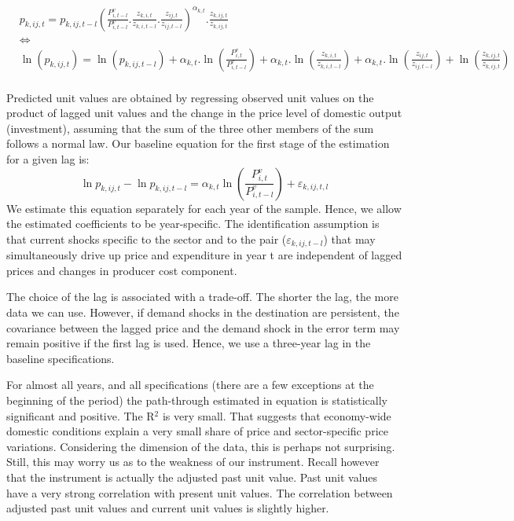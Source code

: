 \documentclass[12pt,twoside,a4paper,notitlepage]{article}
\begin{document}
{\begin{align}
  & {{p}_{k,ij,t}}={{p}_{k,ij,t-l}}{{\left( \frac{P_{i,t-l}^{v}}{P_{i,t-l}^{v}}.\frac{{{z}_{k,i,t}}}{{{z}_{k,i,t-l}}}.\frac{{{z}_{ij,t}}}{{{z}_{ij,t-l}}} \right)}^{{{\alpha }_{k,t}}}}.\frac{{{z}_{k,ij,t}}}{{{z}_{k,ij,t}}} \\ 
 & \Leftrightarrow  \\ 
 & \ln \left( {{p}_{k,ij,t}} \right)=\ln \left( {{p}_{k,ij,t-l}} \right)+{{\alpha }_{k,t}}.\ln \left( \frac{P_{i,t}^{v}}{P_{i,t-l}^{v}} \right)+{{\alpha }_{k,t}}.\ln \left( \frac{{{z}_{k,i,t}}}{{{z}_{k,i,t-l}}} \right)+{{\alpha }_{k,t}}.\ln \left( \frac{{{z}_{ij,t}}}{{{z}_{ij,t-l}}} \right)+\ln \left( \frac{{{z}_{k,ij,t}}}{{{z}_{k,ij,t}}} \right) \\ 
\end{align}

Predicted unit values are obtained by regressing observed unit values on the product of lagged unit values and the change in the price level of domestic output (investment), assuming that the sum of the three other members of the sum follows a normal law.
Our baseline equation for the first stage of the estimation for a given lag is: 
	\[\ln {{p}_{k,ij,t}}-\ln {{p}_{k,ij,t-l}}={{\alpha }_{k,t}}\ln \left( \frac{P_{i,t}^{v}}{P_{i,t-l}^{v}} \right)+{{\varepsilon }_{k,ij,t,l}}\] 	
We estimate this equation separately for each year of the sample.
Hence, we allow the estimated coefficients to be year-specific.
The identification assumption is that current shocks specific to the sector and to the pair (${{\varepsilon }_{k,ij,t-l}}$) that may simultaneously drive up price and expenditure in year t are independent of lagged prices and changes in producer cost component.


The choice of the lag is associated with a trade-off.
The shorter the lag, the more data we can use.
However, if demand shocks in the destination are persistent, the covariance between the lagged price and the demand shock in the error term may remain positive if the first lag is used.
Hence, we use a three-year lag in the baseline specifications.

For almost all years, and all specifications (there are a few exceptions at the beginning of the period) the path-through estimated in equation {\hyperref[ref-009]{ }} is statistically significant and positive.
The R$^{2}$ is very small.
That suggests that economy-wide domestic conditions explain a very small share of price and sector-specific price variations.
Considering the dimension of the data, this is perhaps not surprising.
Still, this may worry us as to the weakness of our instrument.
Recall however that the instrument is actually the adjusted past unit value.
Past unit values have a very strong correlation with present unit values.
The correlation between adjusted past unit values and current unit values is slightly higher.

}
\end{document}
